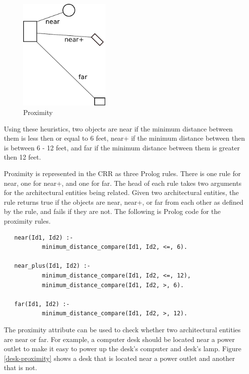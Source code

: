 \documentclass[12pt]{ucthesis}
\begin{document}
\begin{figure}[H]
\centering
\includegraphics[width=45mm]{proximity}
\caption{Proximity}
\label{proximity}
\end{figure}

Using these heuristics, two objects are near if the minimum distance between them is less then or equal to 6 feet, near+ if the minimum distance between then is between 6 - 12 feet, and far if the minimum distance between them is greater then 12 feet. %

Proximity is represented in the CRR as three Prolog rules. There is one rule for near, one for near+, and one for far. The head of each rule takes two arguments for the architectural entities being related. Given two architectural entities, the rule returns true if the objects are near, near+, or far from each other as defined by the rule, and fails if they are not. The following is Prolog code for the proximity rules.

\begin{verbatim}
   near(Id1, Id2) :- 
           minimum_distance_compare(Id1, Id2, <=, 6).
   
   near_plus(Id1, Id2) :-
           minimum_distance_compare(Id1, Id2, <=, 12),
           minimum_distance_compare(Id1, Id2, >, 6).   
   
   far(Id1, Id2) :- 
           minimum_distance_compare(Id1, Id2, >, 12).

\end{verbatim}

The proximity attribute can be used to check whether two architectural entities are near or far. For example, a computer desk should be located near a power outlet to make it easy to power up the desk's computer and desk's lamp. Figure \ref{desk-proximity} shows a desk that is located near a power outlet and another that is not. %
\end{document}
